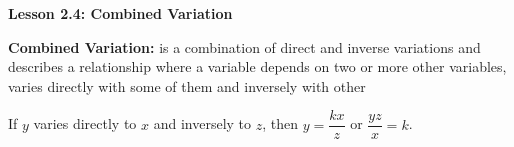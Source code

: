  \begin{center}
\textbf{Lesson 2.4: Combined Variation}
\end{center}

\vspace*{-1.5ex}

\noindent\textbf{Combined Variation:} is a combination of direct and inverse variations and describes a relationship where a variable
depends on two or more other variables, varies directly with some of them
and inversely with other

If $y$ varies directly to $x$ and inversely to $z$, then $y = \dfrac{kx}{z}$ or $\dfrac{yz}{x} = k$.
